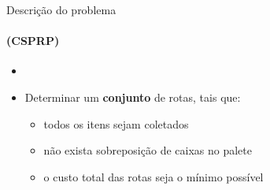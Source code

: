 \documentclass[12pt]{beamer}
\begin{document}
\begin{frame}{Descri\c{c}\~ao do problema}
	\framesubtitle{(CSPRP)}
	\fboxsep=0pt
	\noindent%
		\begin{minipage}[t]{0.60\linewidth}
			\begin{itemize}
				\item[]
				\item {{Determinar um {\bfseries conjunto}} de rotas, tais que:
					\begin{itemize}
						\item todos os itens sejam coletados 
						\item n\~ao exista sobreposi\c{c}\~ao de caixas no palete
						\item o custo total das rotas seja o m\'inimo poss\'ivel  
					\end{itemize}}
				 
				 
		         
			\end{itemize}
			

\end{minipage}
\end{frame}
\end{document}
